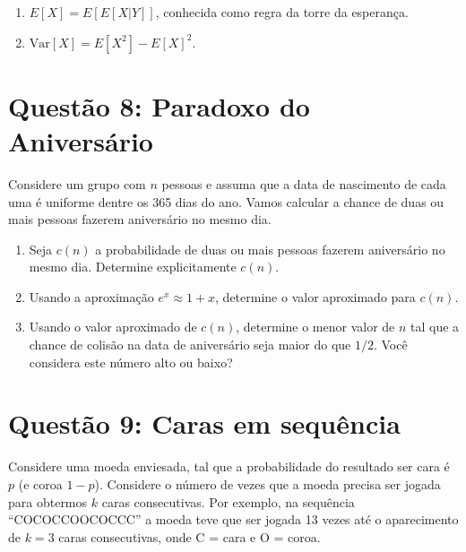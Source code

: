 \documentclass[12 pt]{article}
\begin{document}
\begin{enumerate}
    \item $E[X] = E[E[X|Y]]$, conhecida como regra da torre da esperança.
    \begin{tcolorbox}[colframe=black, title=Resposta:]

    \end{tcolorbox}
    \item $\text{Var}[X] = E[X^2] - E[X]^2$.
    \begin{tcolorbox}[colframe=black, title=Resposta:]

    \end{tcolorbox}
\end{enumerate}

\section*{Questão 8: Paradoxo do Aniversário}
Considere um grupo com $n$ pessoas e assuma que a data de nascimento de cada uma é uniforme dentre
os 365 dias do ano. Vamos calcular a chance de duas ou mais pessoas fazerem aniversário no mesmo dia.

\begin{enumerate}
    \item Seja $c(n)$ a probabilidade de duas ou mais pessoas fazerem aniversário no mesmo dia. Determine explicitamente $c(n)$.
    \begin{tcolorbox}[colframe=black, title=Resposta:]

    \end{tcolorbox}
    \item Usando a aproximação $e^x \approx 1 + x$, determine o valor aproximado para $c(n)$.
    \begin{tcolorbox}[colframe=black, title=Resposta:]

    \end{tcolorbox}
    \item Usando o valor aproximado de $c(n)$, determine o menor valor de $n$ tal que a chance de colisão na data de aniversário seja maior do que $1/2$. Você considera este número alto ou baixo?
    \begin{tcolorbox}[colframe=black, title=Resposta:]

    \end{tcolorbox}
\end{enumerate}

\section*{Questão 9: Caras em sequência}
Considere uma moeda enviesada, tal que a probabilidade do resultado ser cara é $p$ (e coroa $1 - p$).
Considere o número de vezes que a moeda precisa ser jogada para obtermos $k$ caras consecutivas. Por exemplo, na sequência ``COCOCCOOCOCCC'' a moeda teve que ser jogada 13 vezes até o aparecimento de $k = 3$ caras consecutivas, onde C = cara e O = coroa.
\end{document}
